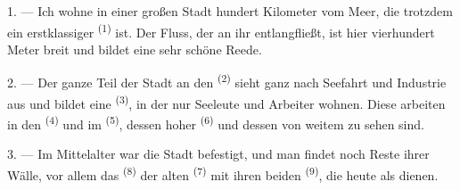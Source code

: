 %
%

\VUsaut{2.0mm}
\VUsaut{3.0mm}
\VUfilet{16mm}
\VUsaut{5.6mm}
\VUsaut{1.4mm}
\VUsaut{2.2mm}

\VUsaut{3.0mm}

1. --- Ich wohne in einer großen Stadt hundert Kilometer vom Meer, die trotzdem ein
erstklassiger  \textsuperscript{(1)} ist. Der Fluss, der an ihr
entlangfließt, ist hier vierhundert Meter breit und bildet eine sehr schöne Reede.

2. --- Der ganze Teil der Stadt an den  \textsuperscript{(2)} sieht ganz
nach Seefahrt und Industrie aus und bildet eine 
\textsuperscript{(3)}, in der nur Seeleute und Arbeiter wohnen. Diese arbeiten in den
 \textsuperscript{(4)} und im 
\textsuperscript{(5)}, dessen hoher  \textsuperscript{(6)} und
dessen  von weitem zu sehen sind.

3. --- Im Mittelalter war die Stadt befestigt, und man findet noch Reste ihrer
Wälle, vor allem das  \textsuperscript{(8)} der alten 
\textsuperscript{(7)} mit ihren beiden  \textsuperscript{(9)}, die
heute als  dienen.

